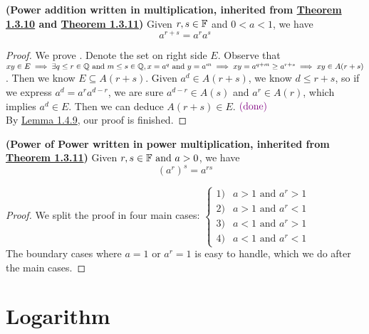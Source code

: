 \documentclass{report}
\begin{document}
\begin{theorem}
\textbf{(Power addition written in multiplication, inherited from \hyperref[1.3.10]{Theorem 1.3.10} and \hyperref[1.3.11]{Theorem 1.3.11})} Given $r,s\in\mathbb{F}$ and $0<a<1$, we have
\begin{equation}
  a^{r+s}=a^ra^s
\end{equation}
\end{theorem}
\begin{proof}
We prove . Denote the set on right side $E$. Observe that $xy\in E \implies \exists q\leq r\in\mathbb{Q}\text{ and }m\leq s\in\mathbb{Q}, x=a^q\text{ and }y=a^m\implies xy=a^{q+m}\geq a^{r+s}\implies xy\in A(r+s)$. Then we know $E\subseteq A(r+s)$. Given $a^d\in A(r+s)$, we know $d\leq r+s$, so if we express $a^d=a^ra^{d-r}$, we are sure $a^{d-r}\in A(s)$ and $a^r\in A(r)$, which implies $a^d\in E$. Then we can deduce $A(r+s)\in E$.$\textcolor{violet}{\text{ (done) }}$\\

By \hyperref[1.4.9]{Lemma 1.4.9}, our proof is finished.
\end{proof}
\begin{theorem}
\textbf{(Power of Power written in power multiplication, inherited from \hyperref[1.3.11]{Theorem 1.3.11})} Given $r,s\in\mathbb{F}\text{ and }a>0$, we have
\begin{equation}
  (a^r)^s=a^{rs}
\end{equation}
\end{theorem}
\begin{proof}
We split the proof in four main cases: $\begin{cases}
  1) & a>1\text{ and }a^r>1 \\
  2) & a>1 \text{ and }a^r<1\\
  3) & a<1\text{ and }a^r>1\\
  4)& a<1\text{ and }a^r<1
\end{cases}$\\

The boundary cases where $a=1\text{ or }a^r=1$ is easy to handle, which we do after the main cases. 
\end{proof}
\section{Logarithm} 
\end{document}
